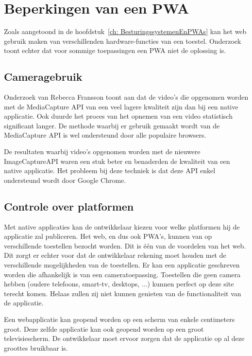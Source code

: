\clearpage
\section{Beperkingen van een PWA}
\label{ch: beperkingenPWA}

Zoals aangetoond in de hoofdstuk~\ref{ch: BesturingssystemenEnPWAs} kan het web gebruik maken van verschillenden hardware-functies van een toestel. Onderzoek toont echter dat voor sommige toepassingen een PWA niet de oplossing is.
\autocite{Malavolta2016}


\subsection{Cameragebruik}
	Onderzoek van Rebecca Fransson toont aan dat de video's die opgenomen worden met de MediaCapture API van een veel lagere kwaliteit zijn dan bij een native applicatie. Ook duurde het proces van het opnemen van een video statistisch significant langer. De methode waarbij er gebruik gemaakt wordt van de MediaCapture API is wel ondersteund door alle populaire browsers. \autocite{Fransson2017}
	
	De resultaten waarbij video's opgenomen worden met de nieuwere ImageCaptureAPI waren een stuk beter en benaderden de kwaliteit van een native applicatie. Het probleem bij deze techniek is dat deze API enkel ondersteund wordt door Google Chrome.
	\autocite{Fransson2017}
	

\subsection{Controle over platformen}
	
	Met native applicaties kan de ontwikkelaar kiezen voor welke platformen hij de applicatie zal publiceren. Het web, en dus ook PWA's, kunnen van op verschillende toestellen bezocht worden. Dit is één van de voordelen van het web. Dit zorgt er echter voor dat de ontwikkelaar rekening moet houden met de verschillende mogelijkheden van de toestellen. Er kan een applicatie geschreven worden die afhankelijk is van een cameratoepassing. Toestellen die geen camera hebben (oudere telefoons, smart-tv, desktops, ...) kunnen perfect op deze site terecht komen. Helaas zullen zij niet kunnen genieten van de functionaliteit van de applicatie.
	
	Een webapplicatie kan geopend worden op een scherm van enkele centimeters groot. Deze zelfde applicatie kan ook geopend worden op een groot televisiescherm. De ontwikkelaar moet ervoor zorgen dat de applicatie op al deze groottes bruikbaar is.
	
